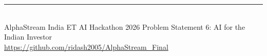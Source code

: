 \documentclass[11pt, a4paper]{article}
\begin{document}
\vfill
\begin{center}
  {\color{cyan}\rule{0.6\linewidth}{0.8pt}}\\[4pt]
  {\small\color{mgray}AlphaStream India \textbullet{} ET AI Hackathon 2026 \textbullet{}
   Problem Statement 6: AI for the Indian Investor}\\[2pt]
  {\small\color{navy}\url{https://github.com/ridash2005/AlphaStream_Final}}
\end{center}
\end{document}
